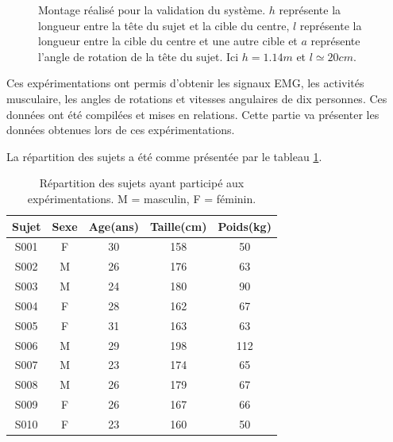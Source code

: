 \documentclass[letterpaper, twoside, 12pt, memoire, creativecommons, hyperref]{thETS}
\begin{document}
\begin{figure}
	\centering
	\caption{Montage réalisé pour la validation du système. $h$ représente la longueur entre la tête du sujet et la cible du centre, $l$ représente la longueur entre la cible du centre et une autre cible et $a$ représente l'angle de rotation de la tête du sujet. Ici $h=1.14m$ et $l\simeq20cm$.}
	\label{fig:sujet}
\end{figure}

Ces expérimentations ont permis d'obtenir les signaux EMG, les activités musculaire, les angles de rotations et vitesses angulaires de dix personnes. Ces données ont été compilées et mises en relations. Cette partie va présenter les données obtenues lors de ces expérimentations.

La répartition des sujets a été comme présentée par le tableau \ref{tab:sujets}.

\begin{table}[ht]
	\caption{Répartition des sujets ayant participé aux expérimentations. M = masculin, F = féminin. }
		\begin{tabular}{|c|c|c|c|c|}
		\hline
			Sujet & Sexe & Age(ans) & Taille(cm) & Poids(kg) \\
	    \hline
	    		S001 & F & 30 & 158 & 50\\
	    \hline
			S002 & M & 26 & 176 & 63\\
	    \hline
	    		S003 & M & 24 & 180 & 90\\
	    \hline
	    		S004 & F & 28 & 162 & 67\\
	    \hline
	    		S005 & F & 31 & 163 & 63\\
	    \hline
	    		S006 & M & 29 & 198 & 112\\
	    \hline
	    		S007 & M & 23 & 174 & 65\\
	    \hline
	    		S008 & M & 26 & 179 & 67\\
	    \hline
	    		S009 & F & 26 & 167 & 66\\
	    \hline
	    		S010 & F & 23 & 160 & 50\\
	    \hline
		\end{tabular}
	\label{tab:sujets}
\end{table}
\end{document}
